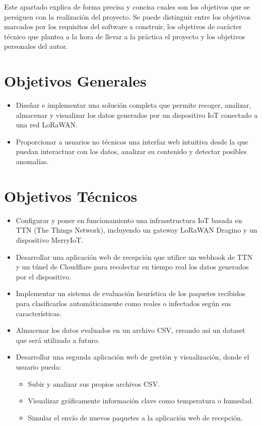 
Este apartado explica de forma precisa y concisa cuales son los objetivos que se persiguen con la realización del proyecto. Se puede distinguir entre los objetivos marcados por los requisitos del software a construir, los objetivos de carácter técnico que plantea a la hora de llevar a la práctica el proyecto y los objetivos personales del autor.

\section {Objetivos Generales}
\begin{itemize}
   \item Diseñar e implementar una solución completa que permite recoger, analizar, almacenar y visualizar los datos generados por un dispositivo IoT conectado a una red LoRaWAN.
    \item Proporcionar a usuarios no técnicos una interfaz web intuitiva desde la que puedan interactuar con los datos, analizar su contenido y detectar posibles anomalías.
\end{itemize}
\section {Objetivos Técnicos}
\begin{itemize}
   \item Configurar y poner en funcionamiento una infraestructura IoT basada en TTN (The Things Network), incluyendo un gateway LoRaWAN Dragino y un dispositivo MerryIoT.
    \item Desarrollar una aplicación web de recepción que utilice un webhook de TTN y un túnel de Cloudflare para recolectar en tiempo real los datos generados por el dispositivo.
    \item Implementar un sistema de evaluación heurística de los paquetes recibidos para clasificarlos automáticamente  como reales o infectados según sus características.
    \item Almacenar los datos evaluados en un archivo CSV, creando así un dataset que será utilizado a futuro.
    \item Desarrollar una segunda aplicación web de gestión y visualización, donde el usuario pueda:
    \begin{itemize}
     \item Subir y analizar sus propios archivos CSV.
     \item Visualizar gráficamente información clave como temperatura o humedad.
     \item Simular el envío de nuevos paquetes a la aplicación web de recepción.
     \end{itemize}
\end{itemize}
